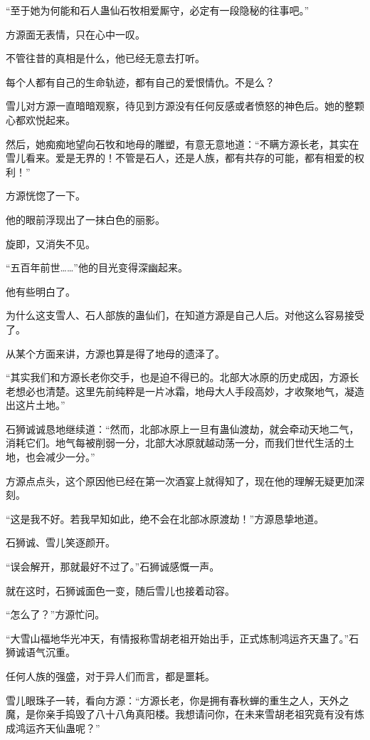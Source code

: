 \begin{this_body}
“至于她为何能和石人蛊仙石牧相爱厮守，必定有一段隐秘的往事吧。”

方源面无表情，只在心中一叹。

不管往昔的真相是什么，他已经无意去打听。

每个人都有自己的生命轨迹，都有自己的爱恨情仇。不是么？

雪儿对方源一直暗暗观察，待见到方源没有任何反感或者愤怒的神色后。她的整颗心都欢悦起来。

然后，她痴痴地望向石牧和地母的雕塑，有意无意地道：“不瞒方源长老，其实在雪儿看来。爱是无界的！不管是石人，还是人族，都有共存的可能，都有相爱的权利！”

方源恍惚了一下。

他的眼前浮现出了一抹白色的丽影。

旋即，又消失不见。

“五百年前世……”他的目光变得深幽起来。

他有些明白了。

为什么这支雪人、石人部族的蛊仙们，在知道方源是自己人后。对他这么容易接受了。

从某个方面来讲，方源也算是得了地母的遗泽了。

“其实我们和方源长老你交手，也是迫不得已的。北部大冰原的历史成因，方源长老想必也清楚。这里先前纯粹是一片冰霜，地母大人手段高妙，才收聚地气，凝造出这片土地。”

石狮诚诚恳地继续道：“然而，北部冰原上一旦有蛊仙渡劫，就会牵动天地二气，消耗它们。地气每被削弱一分，北部大冰原就越动荡一分，而我们世代生活的土地，也会减少一分。”

方源点点头，这个原因他已经在第一次酒宴上就得知了，现在他的理解无疑更加深刻。

“这是我不好。若我早知如此，绝不会在北部冰原渡劫！”方源恳挚地道。

石狮诚、雪儿笑逐颜开。

“误会解开，那就最好不过了。”石狮诚感慨一声。

就在这时，石狮诚面色一变，随后雪儿也接着动容。

“怎么了？”方源忙问。

“大雪山福地华光冲天，有情报称雪胡老祖开始出手，正式炼制鸿运齐天蛊了。”石狮诚语气沉重。

任何人族的强盛，对于异人们而言，都是噩耗。

雪儿眼珠子一转，看向方源：“方源长老，你是拥有春秋蝉的重生之人，天外之魔，是你亲手捣毁了八十八角真阳楼。我想请问你，在未来雪胡老祖究竟有没有炼成鸿运齐天仙蛊呢？”

\end{this_body}

